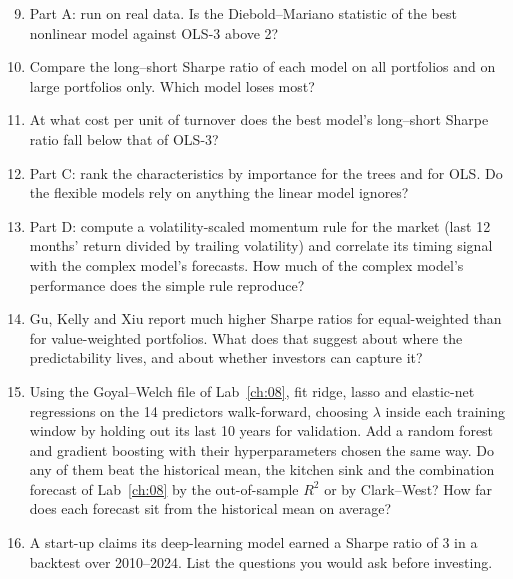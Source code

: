 \begin{enumerate}
  \setcounter{enumi}{8}
  \item Part A: run on real data. Is the Diebold--Mariano statistic of the best nonlinear model against OLS-3 above 2?
  \item Compare the long--short Sharpe ratio of each model on all portfolios and on large portfolios only. Which model loses most?
  \item At what cost per unit of turnover does the best model's long--short Sharpe ratio fall below that of OLS-3?
  \item Part C: rank the characteristics by importance for the trees and for OLS. Do the flexible models rely on anything the linear model ignores?
  \item\label{ex:19-volmom} Part D: compute a volatility-scaled momentum rule for the market (last 12 months' return divided by trailing volatility) and correlate its timing signal with the complex model's forecasts. How much of the complex model's performance does the simple rule reproduce?
  \item Gu, Kelly and Xiu report much higher Sharpe ratios for equal-weighted than for value-weighted portfolios. What does that suggest about where the predictability lives, and about whether investors can capture it?
  \item Using the Goyal--Welch file of Lab~\ref{ch:08}, fit ridge, lasso and elastic-net regressions on the 14 predictors walk-forward, choosing $\lambda$ inside each training window by holding out its last 10 years for validation. Add a random forest and gradient boosting with their hyperparameters chosen the same way. Do any of them beat the historical mean, the kitchen sink and the combination forecast of Lab~\ref{ch:08} by the out-of-sample $R^2$ or by Clark--West? How far does each forecast sit from the historical mean on average?
  \item A start-up claims its deep-learning model earned a Sharpe ratio of 3 in a backtest over 2010--2024. List the questions you would ask before investing.
\end{enumerate}
